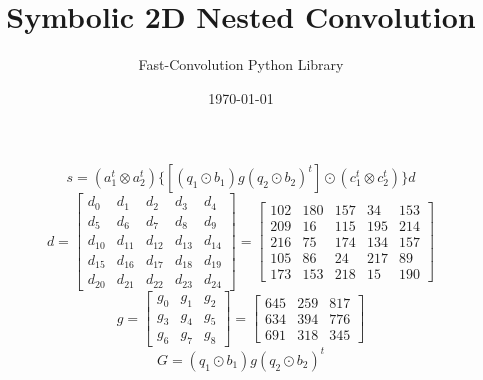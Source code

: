 \documentclass{article}%
\title{Symbolic 2D Nested Convolution}%
\author{Fast{-}Convolution Python Library}%
\date{\today}%
\begin{document}
%
\normalsize%
\maketitle%
\[%
s=(a_1^t \otimes a_2^t) \{[(q_1 \odot b_1) g (q_2 \odot b_2)^t] \odot (c_1^t \otimes c_2^t)\} d%
\]%
\[%
d = \left[\begin{matrix}d_{0} & d_{1} & d_{2} & d_{3} & d_{4}\\d_{5} & d_{6} & d_{7} & d_{8} & d_{9}\\d_{10} & d_{11} & d_{12} & d_{13} & d_{14}\\d_{15} & d_{16} & d_{17} & d_{18} & d_{19}\\d_{20} & d_{21} & d_{22} & d_{23} & d_{24}\end{matrix}\right] = \left[\begin{matrix}102 & 180 & 157 & 34 & 153\\209 & 16 & 115 & 195 & 214\\216 & 75 & 174 & 134 & 157\\105 & 86 & 24 & 217 & 89\\173 & 153 & 218 & 15 & 190\end{matrix}\right]%
\]%
\[%
g = \left[\begin{matrix}g_{0} & g_{1} & g_{2}\\g_{3} & g_{4} & g_{5}\\g_{6} & g_{7} & g_{8}\end{matrix}\right] = \left[\begin{matrix}645 & 259 & 817\\634 & 394 & 776\\691 & 318 & 345\end{matrix}\right]%
\]%
\[%
G = (q_1 \odot b_1) g (q_2 \odot b_2)^t%
\]%
\end{document}
